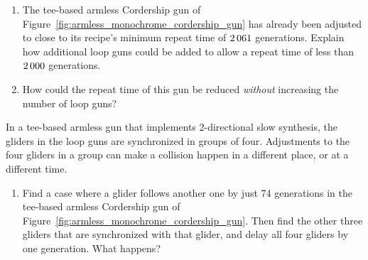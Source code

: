 \begin{multicols}{2}
\begin{problem}
		\begin{enumerate}[label=\bf\color{ocre}(\alph*)]
			\item {} The tee-based armless Cordership gun of Figure~\ref{fig:armless_monochrome_cordership_gun} has already been adjusted to close to its recipe's minimum repeat time of $2{\,}061$ generations. Explain how additional loop guns could be added to allow a repeat time of less than $2{\,}000$ generations.
			
			\item {} How could the repeat time of this gun be reduced \emph{without} increasing the number of loop guns?
		\end{enumerate}
	\end{problem}
	
	
	\mfilbreak
	
	
	\begin{problem}\label{exer:slow_glider_pairs_cordership_armless}
		In a tee-based armless gun that implements 2-directional slow synthesis, the gliders in the loop guns are synchronized in groups of four. Adjustments to the four gliders in a group can make a collision happen in a different place, or at a different time.\smallskip
		
		\begin{enumerate}[label=\bf\color{ocre}(\alph*)]
			\item {} Find a case where a glider follows another one by just 74 generations in the tee-based armless Cordership gun of Figure~\ref{fig:armless_monochrome_cordership_gun}. Then find the other three gliders that are synchronized with that glider, and delay all four gliders by one generation. What happens?
			

\end{enumerate}
\end{problem}
\end{multicols}
